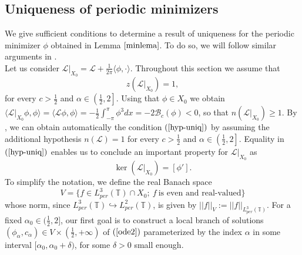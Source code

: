 \documentclass[12pt,reqno]{amsart}
\newcommand{\2}{L^2_{per}(0, T)}
\numberwithin{equation}{section}
\numberwithin{figure}{section}
\begin{document}
\subsection{Uniqueness of periodic minimizers}

We give sufficient conditions to determine a result of uniqueness for the periodic minimizer $\phi$ obtained in Lemma $\ref{minlema}$. To do so, we will follow similar arguments  in \cite[Section 5]{FL}. \\
\indent Let us consider $\mathcal{L}|_{X_0}=\mathcal{L}+\frac{1}{2\pi}\langle\phi,\cdot\rangle$. Throughout this section we assume that
\begin{equation}\label{hyp-uniq}
z(\mathcal{L}|_{X_0})=1,
\end{equation}
for every $c>\frac{1}{2}$ and $\alpha\in\left(\frac{1}{2},2\right]$. Using that $\phi\in X_0$ we obtain $\langle\mathcal{L}|_{X_0}\phi,\phi\rangle=\langle\mathcal{L}\phi,\phi\rangle=-\frac{1}{2}\int_{-\pi}^{\pi}\phi^3dx=-2\mathcal{B}_c(\phi)<0$, so that $n(\mathcal{L}|_{X_0})\geq1$. By \cite[Corollary 4.5]{NPL}, we can obtain automatically the condition $(\ref{hyp-uniq})$ by assuming the additional hypothesis $n(\mathcal{L})=1$
for every $c>\frac{1}{2}$ and $\alpha\in\left(\frac{1}{2},2\right]$. Equality in $(\ref{hyp-uniq})$ enables us to conclude an important property for $\mathcal{L}|_{X_0}$ as
\begin{equation}\label{hyp-uniq2}
\ker(\mathcal{L} |_{X_0}) =[ \phi'].
\end{equation}
\indent To simplify the notation, we define the real Banach space
\begin{equation}\label{banach-uniq}
V=\{f\in L_{per}^3(\mathbb{T})\cap X_0;\  f\ \mbox{is even and real-valued}\}
\end{equation}
whose norm, since $L_{per}^3(\mathbb{T})\hookrightarrow L_{per}^2(\mathbb{T})$, is given by $||f||_{V}:=||f||_{L_{per}^3(\mathbb{T})}.$ For a fixed $\alpha_0\in (\frac{1}{2},2]$, our first goal is to construct a local branch of solutions $(\phi_{\alpha}, c_{\alpha})\in V\times \left(\frac{1}{2},+\infty\right)$ of $(\ref{ode2})$ parameterized by the index $\alpha$ in some interval $[\alpha_0,\alpha_0+\delta)$, for some $\delta>0$ small enough.\\
\end{document}
